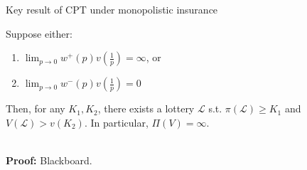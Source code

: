        \begin{frame}{Key result of CPT under monopolistic insurance}
           \begin{proposition}
           Suppose either:\medskip
           \begin{enumerate}[(1)]
               \item $\lim_{p \to 0} w^{+}(p)v\left(\frac{1}{p}\right)=\infty$, or\medskip
               \item $\lim_{p \to 0} w^{-}(p)v\left(\frac{1}{p}\right)=0$\medskip
           \end{enumerate}
           Then, for any $K_1,K_2$, there exists a lottery $\mathcal{L}$
           s.t. $\pi(\mathcal{L}) \geq K_1$ and $V(\mathcal{L}) >v(K_2)$.
           In particular, $\Pi(V)=\infty.$
           \end{proposition}
           \hspace*{\fill} \\
       \textbf{Proof:} Blackboard.
       \end{frame}




